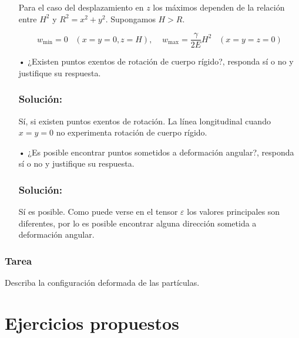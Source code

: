 \documentclass[../notas medios.tex]{subfiles}
\begin{document}
\begin{enumerate}
Para el caso del desplazamiento en $z$ los máximos dependen de la relación 
entre $H^2$ y $R^2=x^2 + y^2$. Supongamos $H>R$. 
	

\[w_{\min} = 0  \;\;\; ( x=y=0,z=H),  \;\;\;\;  w_{\max} = \dfrac{\gamma}{2E} 
H^2  \;\;\; (x=y=z=0)\]

\item[•]¿Existen puntos exentos de rotación de cuerpo rígido?, responda 
sí o no y justifique su respuesta.

\subsubsection{Solución:}

Sí, si existen puntos exentos de rotación. La línea longitudinal cuando $x=y=0$ 
no experimenta rotación de cuerpo rígido. 

\item[•]¿Es posible encontrar puntos sometidos a deformación angular?, responda 
sí o no y justifique su respuesta.

\subsubsection{Solución:}

Sí es posible. Como puede verse en el tensor  $\varepsilon$ los valores 
principales son diferentes, por lo es posible encontrar alguna dirección 
sometida a deformación angular.

\end{enumerate}

\subsubsection{Tarea}

Describa la configuración deformada de las partículas. 

\section{Ejercicios propuestos}
\end{document}
